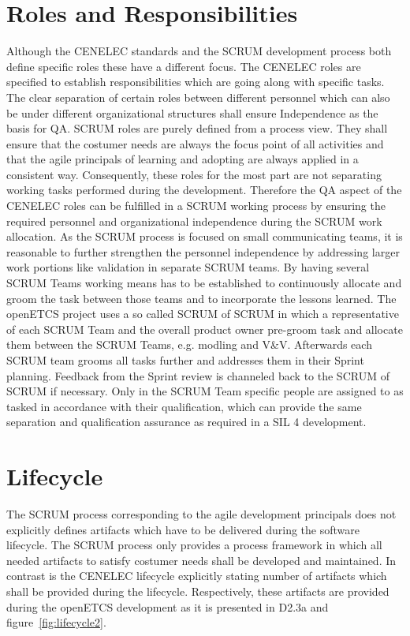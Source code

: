 \section{Roles and Responsibilities}

Although the CENELEC standards and the SCRUM development process both define specific roles these have a different focus. The CENELEC roles are specified to establish responsibilities which are going along with specific tasks. The clear separation of certain roles between different personnel which can also be under different organizational structures shall ensure Independence as the basis for QA. SCRUM roles are purely defined from a process view. They shall ensure that the costumer needs are always the focus point of all activities and that the agile principals of learning and adopting are always applied in a consistent way. Consequently, these roles for the most part are not separating working tasks performed during the development.
Therefore the QA aspect of the CENELEC roles can be fulfilled in a SCRUM working process by ensuring the required personnel and organizational independence during the SCRUM work allocation. As the SCRUM process is focused on small communicating teams, it is reasonable to further strengthen the personnel independence by addressing larger work portions like validation in separate SCRUM teams. By having several SCRUM Teams working means has to be established to continuously allocate and groom the task between those teams and to incorporate the lessons learned. The openETCS project uses a so called SCRUM of SCRUM in which a representative of each SCRUM Team and the overall product owner pre-groom task and allocate them between the SCRUM Teams, e.g. modling and V\&V. Afterwards each SCRUM team grooms all tasks further and addresses them in their Sprint planning. Feedback from the Sprint review is channeled back to the SCRUM of SCRUM if necessary. Only in the SCRUM Team specific people are assigned to as tasked in accordance with their qualification, which can provide the same separation and qualification assurance as required in a SIL 4 development.   
 
\section{Lifecycle}
The SCRUM process corresponding to the agile development principals does not explicitly defines artifacts which have to be delivered during the software lifecycle. The SCRUM process only provides a process framework in which all needed artifacts to satisfy costumer needs shall be developed and maintained. In contrast is the CENELEC lifecycle explicitly stating number of artifacts which shall be provided during the lifecycle. Respectively, these artifacts are provided during the openETCS development as it is presented in D2.3a and figure~\ref{fig:lifecycle2}. 

